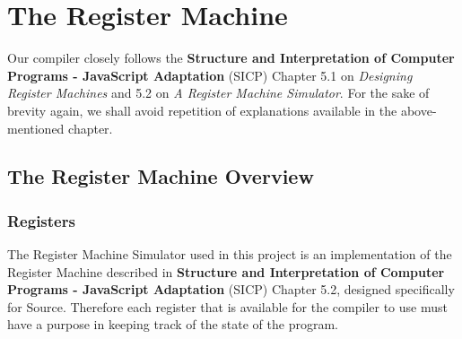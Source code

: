 \setcounter{chapter}{2}





\chapter{The Register Machine}


Our compiler closely follows the \textbf{Structure and Interpretation of Computer Programs \-- JavaScript Adaptation} (SICP) Chapter 5.1 on \textit{Designing Register Machines} and 5.2 on \textit{A Register Machine Simulator}. For the sake of brevity again, we shall avoid repetition of explanations available in the above-mentioned  chapter.\newline


\section{The Register Machine Overview}
\subsection{Registers}

\noindent
The Register Machine Simulator used in this project is an implementation of the Register Machine described in \textbf{Structure and Interpretation of Computer Programs \-- JavaScript Adaptation} (SICP) Chapter 5.2, designed specifically for Source. Therefore each register that is available for the compiler to use must have a purpose in keeping track of the state of the program.\newline

